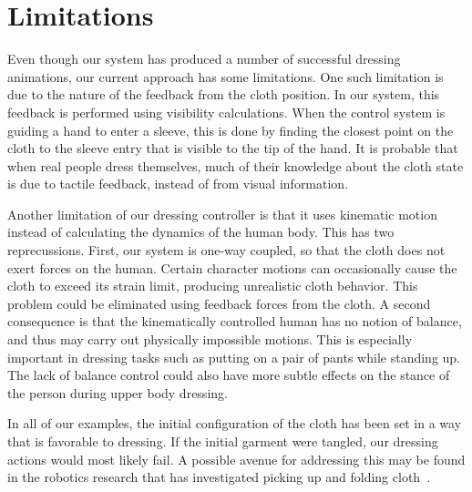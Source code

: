 \section{Limitations}

Even though our system has produced a number of successful dressing
animations, our current approach has some limitations.  One such
limitation is due to the nature of the feedback from the cloth position.
In our system, this feedback is performed using visibility calculations.
When the control system is guiding a hand to enter a sleeve, this is done
by finding the closest point on the cloth to the sleeve entry that is
visible to the tip of the hand.  It is probable that when real people
dress themselves, much of their knowledge about the cloth state is due
to tactile feedback, instead of from visual information.

Another limitation of our dressing controller is that it uses kinematic
motion instead of calculating the dynamics of the human body.  This has
two reprecussions.  First, our system is one-way coupled, so that the
cloth does not exert forces on the human.  Certain character motions can
occasionally cause the cloth to exceed its strain limit, producing
unrealistic cloth behavior.  This problem could be eliminated using
feedback forces from the cloth.  A second consequence is that the
kinematically controlled human has no notion of balance, and thus may
carry out physically impossible motions.  This is especially important in
dressing tasks such as putting on a pair of pants while standing up.  The
lack of balance control could also have more subtle effects on the stance
of the person during upper body dressing.


In all of our examples, the initial configuration of the cloth has been
set in a way that is favorable to dressing.  If the initial garment were
tangled, our dressing actions would most likely fail.  A possible avenue
for addressing this may be found in the robotics research that has
investigated picking up and folding cloth~\cite{Cusumano:2011:BCD}.

